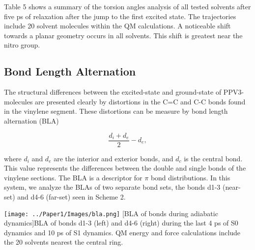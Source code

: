 Table 5 shows a summary of the torsion angles analysis of all tested solvents after five ps of relaxation after the jump to the first excited state.
The trajectories include 20 solvent molecules within the QM calculations.
A noticeable shift towards a planar geometry occurs in all solvents.
This shift is greatest near the nitro group.

\subsection{Bond Length Alternation}
	The structural differences between the excited-state and ground-state of PPV3-molecules are presented clearly by distortions in the C=C and C-C bonds found in the vinylene segment.\cite{tretiak02_densit_matrix_analy_simul_elect, karabunarliev2000rigorous, karabunarliev2000adiabatic, nelson2014nonadiabatic}
	These distortions can be measure by bond length alternation (BLA)

	\begin{equation}
	\frac{d_i + d_e}{2} - d_e,
	\end{equation}

	where \(d_i\) and \(d_e\) are the interior and exterior bonds, and \(d_c\) is the central bond.
	This value represents the differences between the double and single bonds of the vinylene sections.
	The BLA is a descriptor for \(\pi\) bond distributions. \cite{tretiak2002conformational}
	In this system, we analyze the BLAs of two separate bond sets, the bonds d1-3 (near-set) and d4-6 (far-set) seen in Scheme 2. 

	\noindent
	\begin{minipage}[c]{\textwidth} 
	  \centering
	  \texttt{[image: ../Paper1/Images/bla.png]}
	  [BLA of bonds during adiabatic dynamics]{BLA of bonds d1-3 (left) and d4-6 (right) during the last 4 ps of S0 dynamics and 10 ps of S1 dynamics.
	    QM energy and force calculations include the 20 solvents nearest the central ring.}
	  \label{fig:bla_adiabatic}
	\end{minipage}\bigskip



